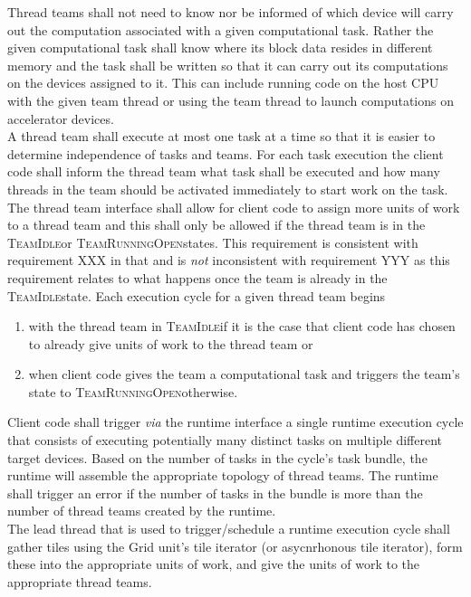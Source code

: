 \documentclass{article}
\newcommand{\TeamIdle}          {\textsc{TeamIdle}}
\newcommand{\TeamRunningOpen}   {\textsc{TeamRunningOpen}}
\begin{document}
Thread teams shall not need to know nor be informed of which device will carry
out the computation associated with a given computational task.  Rather the
given computational task shall know where its block data resides in different
memory and the task shall be written so that it can carry out its computations
on the devices assigned to it.  This can include running code on the host CPU
with the given team thread or using the team thread to launch computations on
accelerator devices.\\

A thread team shall execute at most one task at a time so that it is easier to
determine independence of tasks and teams.  For each task execution the client
code shall inform the thread team what task shall be executed and how many
threads in the team should be activated immediately to start work on the task.\\

The thread team interface shall allow for client code to assign more units of
work to a thread team and this shall only be allowed if the thread team is in the
\TeamIdle or \TeamRunningOpen states.  This requirement is consistent with
requirement XXX in that and is \emph{not} inconsistent with requirement YYY as
this requirement relates to what happens once the team is already in the
\TeamIdle state.  Each execution cycle for a given thread team begins
\begin{enumerate}
\item{with the thread team in \TeamIdle if it is the case that client code has
chosen to already give units of work to the thread team or}
\item{when client code gives the team a computational task and triggers the
team's state to \TeamRunningOpen otherwise.}
\end{enumerate}

Client code shall trigger \textit{via} the runtime interface a single runtime
execution cycle that consists of executing potentially many distinct tasks on
multiple different target devices.  Based on the number of tasks in the cycle's
task bundle, the runtime will assemble the appropriate topology of thread teams.
The runtime shall trigger an error if the number of tasks in the bundle is more
than the number of thread teams created by the runtime.\\

The lead thread that is used to trigger/schedule a runtime execution cycle shall
gather tiles using the Grid unit's tile iterator (or asycnrhonous tile
iterator), form these into the appropriate units of work, and give the units of
work to the appropriate thread teams.\\
\end{document}
